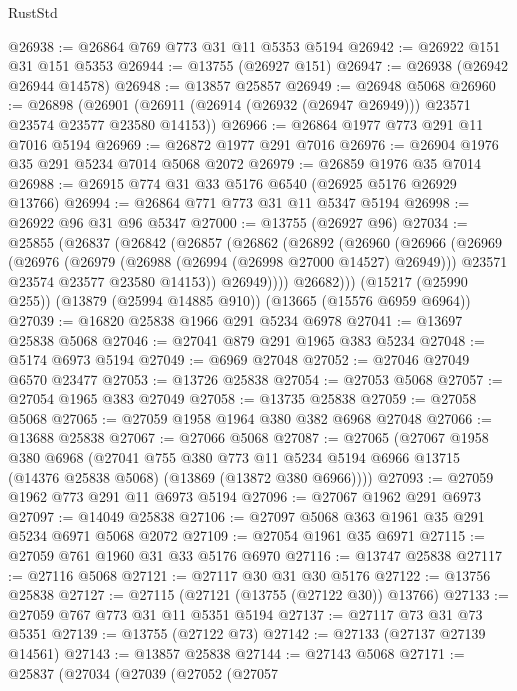 \begin{lexlean}{RustStd}
\begin{coremodule}
@26938 := @26864 @769 @773 @31 @11 @5353 @5194
@26942 := @26922 @151 @31 @151 @5353
@26944 := @13755 (@26927 @151)
@26947 := @26938 (@26942 @26944 @14578)
@26948 := @13857 @25857
@26949 := @26948 @5068
@26960 := @26898
    (@26901 (@26911 (@26914 (@26932 (@26947 @26949))) @23571 @23574 @23577 @23580 @14153))
@26966 := @26864 @1977 @773 @291 @11 @7016 @5194
@26969 := @26872 @1977 @291 @7016
@26976 := @26904 @1976 @35 @291 @5234 @7014 @5068 @2072
@26979 := @26859 @1976 @35 @7014
@26988 := @26915 @774 @31 @33 @5176 @6540 (@26925 @5176 @26929 @13766)
@26994 := @26864 @771 @773 @31 @11 @5347 @5194
@26998 := @26922 @96 @31 @96 @5347
@27000 := @13755 (@26927 @96)
@27034 := @25855
    (@26837
      (@26842
        (@26857
          (@26862
            (@26892
              (@26960
                (@26966
                  (@26969
                    (@26976
                      (@26979 (@26988 (@26994 (@26998 @27000 @14527) @26949)))
                      @23571
                      @23574
                      @23577
                      @23580
                      @14153))
                  @26949))))
          @26682)))
    (@15217 (@25990 @255))
    (@13879 (@25994 @14885 @910))
    (@13665 (@15576 @6959 @6964))
@27039 := @16820 @25838 @1966 @291 @5234 @6978
@27041 := @13697 @25838 @5068
@27046 := @27041 @879 @291 @1965 @383 @5234
@27048 := @5174 @6973 @5194
@27049 := @6969 @27048
@27052 := @27046 @27049 @6570 @23477
@27053 := @13726 @25838
@27054 := @27053 @5068
@27057 := @27054 @1965 @383 @27049
@27058 := @13735 @25838
@27059 := @27058 @5068
@27065 := @27059 @1958 @1964 @380 @382 @6968 @27048
@27066 := @13688 @25838
@27067 := @27066 @5068
@27087 := @27065
    (@27067
      @1958
      @380
      @6968
      (@27041
        @755
        @380
        @773
        @11
        @5234
        @5194
        @6966
        @13715
        (@14376 @25838 @5068)
        (@13869 (@13872 @380 @6966))))
@27093 := @27059 @1962 @773 @291 @11 @6973 @5194
@27096 := @27067 @1962 @291 @6973
@27097 := @14049 @25838
@27106 := @27097 @5068 @363 @1961 @35 @291 @5234 @6971 @5068 @2072
@27109 := @27054 @1961 @35 @6971
@27115 := @27059 @761 @1960 @31 @33 @5176 @6970
@27116 := @13747 @25838
@27117 := @27116 @5068
@27121 := @27117 @30 @31 @30 @5176
@27122 := @13756 @25838
@27127 := @27115 (@27121 (@13755 (@27122 @30)) @13766)
@27133 := @27059 @767 @773 @31 @11 @5351 @5194
@27137 := @27117 @73 @31 @73 @5351
@27139 := @13755 (@27122 @73)
@27142 := @27133 (@27137 @27139 @14561)
@27143 := @13857 @25838
@27144 := @27143 @5068
@27171 := @25837
    (@27034
      (@27039
        (@27052
          (@27057

\end{coremodule}
\end{lexlean}
